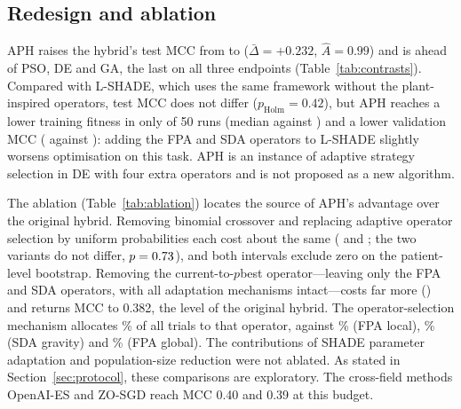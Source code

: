 \documentclass[10pt,letterpaper]{article}
\begin{document}
\subsection{Redesign and ablation}\label{sec:redesign}
APH raises the hybrid's test MCC from \MCCHybrid{} to \MCCAph{} ($\bar\Delta=+0.232$, $\hat A=0.99$) and is ahead of PSO, DE and GA, the last on all three endpoints (Table~\ref{tab:contrasts}). Compared with L-SHADE, which uses the same framework without the plant-inspired operators, test MCC does not differ ($p_{\mathrm{Holm}}=0.42$), but APH reaches a lower training fitness in only \WinFitAphlShade{} of 50 runs (median \FitAph{} against \FitLshade) and a lower validation MCC (\ValAph{} against \ValLshade): adding the FPA and SDA operators to L-SHADE slightly worsens optimisation on this task. APH is an instance of adaptive strategy selection in DE \citep{qin2009sade,gong2011strategy} with four extra operators and is not proposed as a new algorithm.

The ablation (Table~\ref{tab:ablation}) locates the source of APH's advantage over the original hybrid. Removing binomial crossover and replacing adaptive operator selection by uniform probabilities each cost about the same (\AblNoCx{} and \AblUniform; the two variants do not differ, $p=0.73$), and both intervals exclude zero on the patient-level bootstrap. Removing the current-to-$p$best operator---leaving only the FPA and SDA operators, with all adaptation mechanisms intact---costs far more (\AblPlant) and returns MCC to 0.382, the level of the original hybrid. The operator-selection mechanism allocates \ShareAnimal\% of all trials to that operator, against \ShareLocal\% (FPA local), \ShareGravity\% (SDA gravity) and \ShareGlobal\% (FPA global). The contributions of SHADE parameter adaptation and population-size reduction were not ablated. As stated in Section~\ref{sec:protocol}, these comparisons are exploratory. The cross-field methods OpenAI-ES and ZO-SGD reach MCC 0.40 and 0.39 at this budget.


\end{document}
